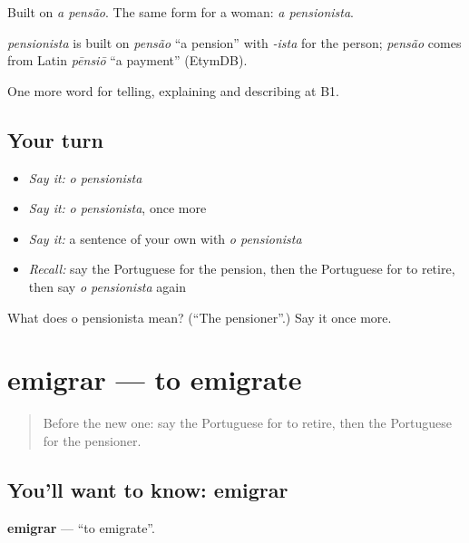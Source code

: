 Built on \emph{a pensão}. The same form for a woman: \emph{a pensionista}.

\begin{cousinweb}
\emph{pensionista} is built on \emph{pensão} \textquotedblleft{}a pension\textquotedblright{} with \emph{-ista} for the person; \emph{pensão} comes from Latin \emph{pēnsiō} \textquotedblleft{}a payment\textquotedblright{} (EtymDB).
\end{cousinweb}

\begin{grammarlens}[title={What you've built}]
One more word for telling, explaining and describing at B1.
\end{grammarlens}

\subsection*{Your turn}
\begin{itemize}
\raggedright
  \item \emph{Say it:} \emph{o pensionista}
  \item \emph{Say it:} \emph{o pensionista}, once more
  \item \emph{Say it:} a sentence of your own with \emph{o pensionista}
  \item \emph{Recall:} say the Portuguese for the pension, then the Portuguese for to retire, then say \emph{o pensionista} again
\end{itemize}

\begin{tcolorbox}[breakable,colback=teal!4,colframe=teal!35!black,title={Before you move on}]
What does o pensionista mean? (\textquotedblleft{}The pensioner\textquotedblright{}.) Say it once more.
\end{tcolorbox}
\section[emigrar]{emigrar — to emigrate}

\label{lesson:PT-C317-emigrar}



\begin{quote}
Before the new one: say the Portuguese for to retire, then the Portuguese for the pensioner.
\end{quote}

\subsection*{You'll want to know: emigrar}
\textbf{emigrar} — \textquotedblleft{}to emigrate\textquotedblright{}.

